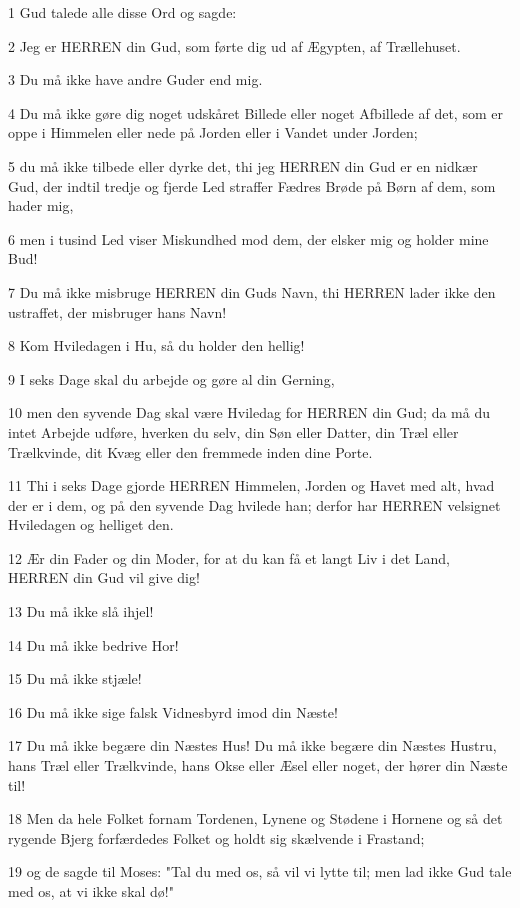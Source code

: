 \par 1 Gud talede alle disse Ord og sagde:
\par 2 Jeg er HERREN din Gud, som førte dig ud af Ægypten, af Trællehuset.
\par 3 Du må ikke have andre Guder end mig.
\par 4 Du må ikke gøre dig noget udskåret Billede eller noget Afbillede af det, som er oppe i Himmelen eller nede på Jorden eller i Vandet under Jorden;
\par 5 du må ikke tilbede eller dyrke det, thi jeg HERREN din Gud er en nidkær Gud, der indtil tredje og fjerde Led straffer Fædres Brøde på Børn af dem, som hader mig,
\par 6 men i tusind Led viser Miskundhed mod dem, der elsker mig og holder mine Bud!
\par 7 Du må ikke misbruge HERREN din Guds Navn, thi HERREN lader ikke den ustraffet, der misbruger hans Navn!
\par 8 Kom Hviledagen i Hu, så du holder den hellig!
\par 9 I seks Dage skal du arbejde og gøre al din Gerning,
\par 10 men den syvende Dag skal være Hviledag for HERREN din Gud; da må du intet Arbejde udføre, hverken du selv, din Søn eller Datter, din Træl eller Trælkvinde, dit Kvæg eller den fremmede inden dine Porte.
\par 11 Thi i seks Dage gjorde HERREN Himmelen, Jorden og Havet med alt, hvad der er i dem, og på den syvende Dag hvilede han; derfor har HERREN velsignet Hviledagen og helliget den.
\par 12 Ær din Fader og din Moder, for at du kan få et langt Liv i det Land, HERREN din Gud vil give dig!
\par 13 Du må ikke slå ihjel!
\par 14 Du må ikke bedrive Hor!
\par 15 Du må ikke stjæle!
\par 16 Du må ikke sige falsk Vidnesbyrd imod din Næste!
\par 17 Du må ikke begære din Næstes Hus! Du må ikke begære din Næstes Hustru, hans Træl eller Trælkvinde, hans Okse eller Æsel eller noget, der hører din Næste til!
\par 18 Men da hele Folket fornam Tordenen, Lynene og Stødene i Hornene og så det rygende Bjerg forfærdedes Folket og holdt sig skælvende i Frastand;
\par 19 og de sagde til Moses: "Tal du med os, så vil vi lytte til; men lad ikke Gud tale med os, at vi ikke skal dø!"
